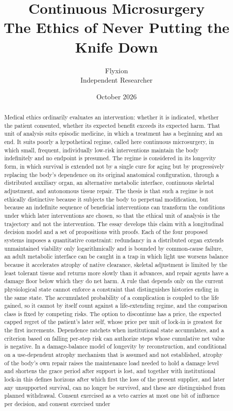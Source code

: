 \documentclass[11pt]{article}
\title{Continuous Microsurgery\\[0.5em]
\large The Ethics of Never Putting the Knife Down}
\author{Flyxion\\Independent Researcher}
\date{October 2026}
\theoremstyle{plain}
\theoremstyle{definition}
\theoremstyle{remark}
\begin{document}
\maketitle

\begin{abstract}
\noindent
Medical ethics ordinarily evaluates an intervention: whether it is indicated, whether the patient consented, whether its expected benefit exceeds its expected harm. That unit of analysis suits episodic medicine, in which a treatment has a beginning and an end. It suits poorly a hypothetical regime, called here continuous microsurgery, in which small, frequent, individually low-risk interventions maintain the body indefinitely and no endpoint is presumed. The regime is considered in its longevity form, in which survival is extended not by a single cure for aging but by progressively replacing the body's dependence on its original anatomical configuration, through a distributed auxiliary organ, an alternative metabolic interface, continuous skeletal adjustment, and autonomous tissue repair. The thesis is that such a regime is not ethically distinctive because it subjects the body to perpetual modification, but because an indefinite sequence of beneficial interventions can transform the conditions under which later interventions are chosen, so that the ethical unit of analysis is the trajectory and not the intervention. The essay develops this claim with a longitudinal decision model and a set of propositions with proofs. Each of the four proposed systems imposes a quantitative constraint: redundancy in a distributed organ extends unmaintained viability only logarithmically and is bounded by common-cause failure, an adult metabolic interface can be caught in a trap in which light use worsens balance because it accelerates atrophy of native clearance, skeletal adjustment is limited by the least tolerant tissue and returns more slowly than it advances, and repair agents have a damage floor below which they do net harm. A rule that depends only on the current physiological state cannot enforce a constraint that distinguishes histories ending in the same state. The accumulated probability of a complication is coupled to the life gained, so it cannot by itself count against a life-extending regime, and the comparison class is fixed by competing risks. The option to discontinue has a price, the expected capped regret of the patient's later self, whose price per unit of lock-in is greatest for the first increments. Dependence ratchets when institutional state accumulates, and a criterion based on falling per-step risk can authorize steps whose cumulative net value is negative. In a damage-balance model of longevity by reconstruction, and conditional on a use-dependent atrophy mechanism that is assumed and not established, atrophy of the body's own repair raises the maintenance load needed to hold a damage level and shortens the grace period after support is lost, and together with institutional lock-in this defines horizons after which first the loss of the present supplier, and later any unsupported survival, can no longer be survived, and these are distinguished from planned withdrawal. Consent exercised as a veto carries at most one bit of influence per decision, and consent exercised under 
\end{abstract}
\end{document}
